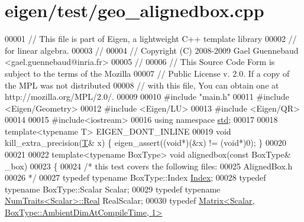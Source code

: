 \hypertarget{eigen_2test_2geo__alignedbox_8cpp_source}{}\section{eigen/test/geo\+\_\+alignedbox.cpp}
\label{eigen_2test_2geo__alignedbox_8cpp_source}

\begin{DoxyCode}
00001 \textcolor{comment}{// This file is part of Eigen, a lightweight C++ template library}
00002 \textcolor{comment}{// for linear algebra.}
00003 \textcolor{comment}{//}
00004 \textcolor{comment}{// Copyright (C) 2008-2009 Gael Guennebaud <gael.guennebaud@inria.fr>}
00005 \textcolor{comment}{//}
00006 \textcolor{comment}{// This Source Code Form is subject to the terms of the Mozilla}
00007 \textcolor{comment}{// Public License v. 2.0. If a copy of the MPL was not distributed}
00008 \textcolor{comment}{// with this file, You can obtain one at http://mozilla.org/MPL/2.0/.}
00009 
00010 \textcolor{preprocessor}{#include "main.h"}
00011 \textcolor{preprocessor}{#include <Eigen/Geometry>}
00012 \textcolor{preprocessor}{#include <Eigen/LU>}
00013 \textcolor{preprocessor}{#include <Eigen/QR>}
00014 
00015 \textcolor{preprocessor}{#include<iostream>}
00016 \textcolor{keyword}{using namespace }\hyperlink{namespacestd}{std};
00017 
00018 \textcolor{keyword}{template}<\textcolor{keyword}{typename} T> EIGEN\_DONT\_INLINE
00019 \textcolor{keywordtype}{void} kill\_extra\_precision(\hyperlink{group___sparse_core___module_class_eigen_1_1_triplet}{T}& x) \{ eigen\_assert((\textcolor{keywordtype}{void}*)(&x) != (\textcolor{keywordtype}{void}*)0); \}
00020 
00021 
00022 \textcolor{keyword}{template}<\textcolor{keyword}{typename} BoxType> \textcolor{keywordtype}{void} alignedbox(\textcolor{keyword}{const} BoxType& \_box)
00023 \{
00024   \textcolor{comment}{/* this test covers the following files:}
00025 \textcolor{comment}{     AlignedBox.h}
00026 \textcolor{comment}{  */}
00027   \textcolor{keyword}{typedef} \textcolor{keyword}{typename} BoxType::Index \hyperlink{namespace_eigen_a62e77e0933482dafde8fe197d9a2cfde}{Index};  
00028   \textcolor{keyword}{typedef} \textcolor{keyword}{typename} BoxType::Scalar Scalar;
00029   \textcolor{keyword}{typedef} \textcolor{keyword}{typename} \hyperlink{group___core___module_struct_eigen_1_1_num_traits}{NumTraits<Scalar>::Real} RealScalar;
00030   \textcolor{keyword}{typedef} \hyperlink{group___core___module_class_eigen_1_1_matrix}{Matrix<Scalar, BoxType::AmbientDimAtCompileTime, 1>}

\end{DoxyCode}
